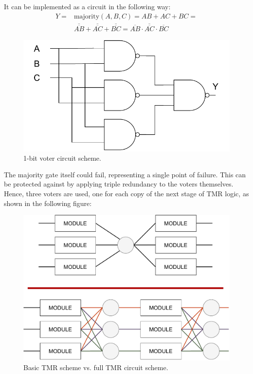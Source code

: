 It can be implemented as a circuit in the following way:
\begin{equation}
\begin{aligned}
Y ={} & \text{majority}(A, B, C) = AB + AC + BC = \\
      & \overline{\overline{AB}} + \overline{\overline{AC}} + \overline{\overline{BC}} = \overline{\overline{AB}\cdot\overline{AC}\cdot\overline{BC}}
\end{aligned}
\end{equation}

\begin{figure}[H]
\centering
\includegraphics[width=0.7\linewidth]{images/chapter4/tmr_circuit.pdf}
\caption{1-bit voter circuit scheme.}
\label{fig:voter_scheme}
\end{figure}

The majority gate itself could fail, representing a single point of failure. This can be protected against by applying triple redundancy to the voters themselves. Hence, three voters are used, one for each copy of the next stage of TMR logic, as shown in the following figure:

\begin{figure}[H]
\centering
\includegraphics[width=0.9\linewidth]{images/chapter4/tmr_voter.pdf}
\caption{Basic TMR scheme vs. full TMR circuit scheme.}
\end{figure}

